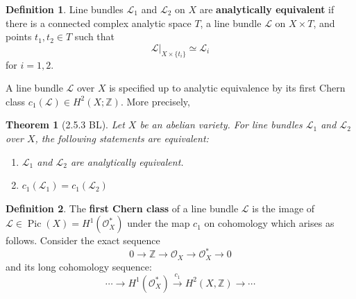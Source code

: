 \documentclass[12pt,reqno]{amsart}
\DeclareMathOperator{\Pic}{Pic}
\newcommand{\Z}{\mathbb{Z}}
\newcommand{\mc}{\mathcal}
\newtheorem*{thm*}{Theorem}
\theoremstyle{definition}
\newtheorem{defn}{Definition}
\theoremstyle{remark}
\newcommand{\ti}{\todo[inline]}
\begin{document}
\begin{defn} Line bundles $\mc{L}_1$ and $\mc{L}_2$  on $X$ are \textbf{analytically equivalent} if there is a connected complex analytic space $T$, a line bundle $\mc{L}$ on $X \times T$, and points $t_1, t_2 \in T$ such that $$\mc{L} |_{X\times \{t_i\}} \simeq \mc{L}_i$$ for $i = 1, 2$. \end{defn}

A line bundle $\mc{L}$ over $X$ is specified up to analytic equivalence by its first Chern class $c_1(\mc{L}) \in H^2(X; \Z)$. More precisely,

\begin{thm*} 
[2.5.3 BL] Let $X$ be an abelian variety. For line bundles $\mc{L}_1$ and $\mc{L}_2$ over $X$, the following statements are equivalent: 
\begin{enumerate} 
\item $\mc{L}_1$ and $\mc{L}_2$ are analytically equivalent.
\item $c_1(\mc{L}_1) = c_1(\mc{L}_2)$
\end{enumerate}
\end{thm*}






\begin{defn} The \textbf{first Chern class} of a line bundle $\mc{L}$ is the image of $\mc{L} \in \Pic(X) = H^1(\mc{O}_X^*)$ under the map $c_1$ on cohomology which arises as follows. Consider the exact sequence $$0 \to \Z \to \mc{O}_X \to \mc{O}_X^* \to 0$$ and its long cohomology sequence:
$$\cdots \to H^1(\mc{O}_X^*) \xrightarrow{c_1} H^2(X, \Z) \to \cdots$$ \end{defn} 




\end{document}
